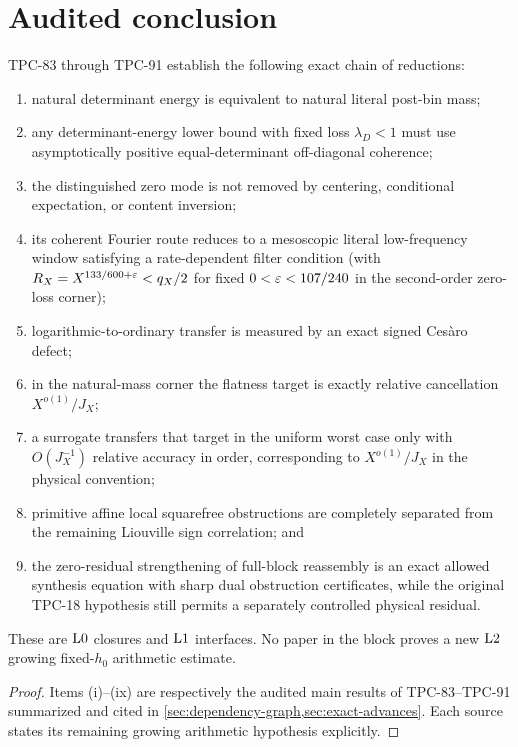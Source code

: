 \section{Audited conclusion}
\label{sec:claim-boundary}

\begin{theorem}
\label{thm:ten-paper-conclusion}
TPC-83 through TPC-91 establish the following exact chain of
reductions:
\begin{enumerate}[label=(\roman*),leftmargin=2.2em]
\item natural determinant energy is equivalent to natural literal
  post-bin mass;
\item any determinant-energy lower bound with fixed loss
  \(\lambda_D<1\) must use asymptotically positive equal-determinant
  off-diagonal coherence;
\item the distinguished zero mode is not removed by centering,
  conditional expectation, or content inversion;
\item its coherent Fourier route reduces to a mesoscopic literal
  low-frequency window satisfying a rate-dependent filter condition
  (with \(R_X=X^{133/600+\varepsilon}<q_X/2\) for fixed
  \(0<\varepsilon<107/240\) in the second-order zero-loss corner);
\item logarithmic-to-ordinary transfer is measured by an exact signed
  Ces\`aro defect;
\item in the natural-mass corner the flatness target is exactly
  relative cancellation \(X^{o(1)}/J_X\);
\item a surrogate transfers that target in the uniform worst case
  only with \(O(J_X^{-1})\) relative accuracy in order, corresponding
  to \(X^{o(1)}/J_X\) in the physical convention;
\item primitive affine local squarefree obstructions are completely
  separated from the remaining Liouville sign correlation; and
\item the zero-residual strengthening of full-block reassembly is an
  exact allowed synthesis equation with sharp dual obstruction
  certificates, while the original TPC-18 hypothesis still permits a
  separately controlled physical residual.
\end{enumerate}
These are \(\mathrm{L0}\) closures and \(\mathrm{L1}\) interfaces.  No paper in
the block proves a new \(\mathrm{L2}\) growing fixed-\(h_0\) arithmetic
estimate.
\end{theorem}

\begin{proof}
Items (i)--(ix) are respectively the audited main results of
TPC-83--TPC-91 summarized and cited in
\cref{sec:dependency-graph,sec:exact-advances}.  Each source states
its remaining growing arithmetic hypothesis explicitly.
\end{proof}

